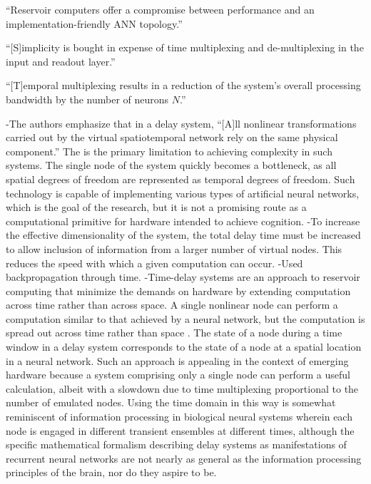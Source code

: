 ``Reservoir computers offer a compromise between performance and an implementation-friendly ANN topology.''

``[S]implicity is bought in expense of time multiplexing and de-multiplexing in the input and readout layer.'' 

``[T]emporal multiplexing results in a reduction of the system's overall processing bandwidth by the number of neurons $N$.''

-The authors emphasize that in a delay system, ``[A]ll nonlinear transformations carried out by the virtual spatiotemporal network rely on the same physical component.'' The is the primary limitation to achieving complexity in such systems. The single node of the system quickly becomes a bottleneck, as all spatial degrees of freedom are represented as temporal degrees of freedom. Such technology is capable of implementing various types of artificial neural networks, which is the goal of the research, but it is not a promising route as a computational primitive for hardware intended to achieve cognition.
-To increase the effective dimensionality of the system, the total delay time must be increased to allow inclusion of information from a larger number of virtual nodes. This reduces the speed with which a given computation can occur.
-Used backpropagation through time.
-Time-delay systems are an approach to reservoir computing that minimize the demands on hardware by extending computation across time rather than across space. A single nonlinear node can perform a computation similar to that achieved by a neural network, but the computation is spread out across time rather than space \cite{brpe2018}. The state of a node during a time window in a delay system corresponds to the state of a node at a spatial location in a neural network. Such an approach is appealing in the context of emerging hardware because a system comprising only a single node can perform a useful calculation, albeit with a slowdown due to time multiplexing proportional to the number of emulated nodes. Using the time domain in this way is somewhat reminiscent of information processing in biological neural systems wherein each node is engaged in different transient ensembles at different times, although the specific mathematical formalism describing delay systems as manifestations of recurrent neural networks are not nearly as general as the information processing principles of the brain, nor do they aspire to be.


